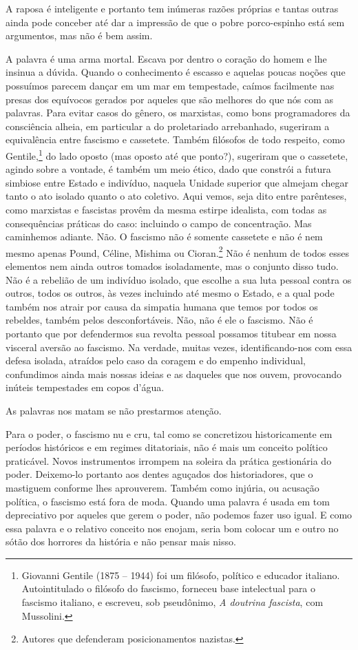 A raposa é inteligente e portanto tem inúmeras razões próprias e tantas
outras ainda pode conceber até dar a impressão de que o pobre
porco-espinho está sem argumentos, mas não é bem assim.

A palavra é uma arma mortal. Escava por dentro o coração do homem e lhe
insinua a dúvida. Quando o conhecimento é escasso e aquelas poucas
noções que possuímos parecem dançar em um mar em tempestade, caímos
facilmente nas presas dos equívocos gerados por aqueles que são melhores
do que nós com as palavras. Para evitar casos do gênero, os marxistas,
como bons programadores da consciência alheia, em particular a do
proletariado arrebanhado, sugeriram a equivalência entre fascismo e
cassetete. Também filósofos de todo respeito, como Gentile,\footnote{Giovanni Gentile (1875 -- 1944) foi um filósofo, político e educador
  italiano. Autointitulado o filósofo do fascismo, forneceu base
  intelectual para o fascismo italiano, e escreveu, sob pseudônimo,
  \emph{A doutrina fascista}, com Mussolini.} do lado oposto (mas oposto até que ponto?), sugeriram
que o cassetete, agindo sobre a vontade, é também um meio ético, dado
que constrói a futura simbiose entre Estado e indivíduo, naquela Unidade
superior que almejam chegar tanto o ato isolado quanto o ato coletivo.
Aqui vemos, seja dito entre parênteses, como marxistas e fascistas
provêm da mesma estirpe idealista, com todas as consequências práticas
do caso: incluindo o campo de concentração. Mas caminhemos adiante. Não.
O fascismo não é somente cassetete e não é nem mesmo apenas Pound,
Céline, Mishima ou Cioran.\footnote{Autores que defenderam posicionamentos nazistas.} Não é nenhum de todos esses elementos nem ainda outros
tomados isoladamente, mas o conjunto disso tudo. Não é a rebelião de um
indivíduo isolado, que escolhe a sua luta pessoal contra os outros,
todos os outros, às vezes incluindo até mesmo o Estado, e a qual pode
também nos atrair por causa da simpatia humana que temos por todos os
rebeldes, também pelos desconfortáveis. Não, não é ele o fascismo. Não é
portanto que por defendermos sua revolta pessoal possamos titubear em
nossa visceral aversão ao fascismo. Na verdade, muitas vezes,
identificando-nos com essa defesa isolada, atraídos pelo caso da coragem
e do empenho individual, confundimos ainda mais nossas ideias e as
daqueles que nos ouvem, provocando inúteis tempestades em copos d'água.

As palavras nos matam se não prestarmos atenção.

Para o poder, o fascismo nu e cru, tal como se concretizou
historicamente em períodos históricos e em regimes ditatoriais, não é
mais um conceito político praticável. Novos instrumentos irrompem na
soleira da prática gestionária do poder. Deixemo-lo portanto aos dentes
aguçados dos historiadores, que o mastiguem conforme lhes aprouverem.
Também como injúria, ou acusação política, o fascismo está fora de moda.
Quando uma palavra é usada em tom depreciativo por aqueles que gerem o
poder, não podemos fazer uso igual. E como essa palavra e o relativo
conceito nos enojam, seria bom colocar um e outro no sótão dos horrores
da história e não pensar mais nisso.


